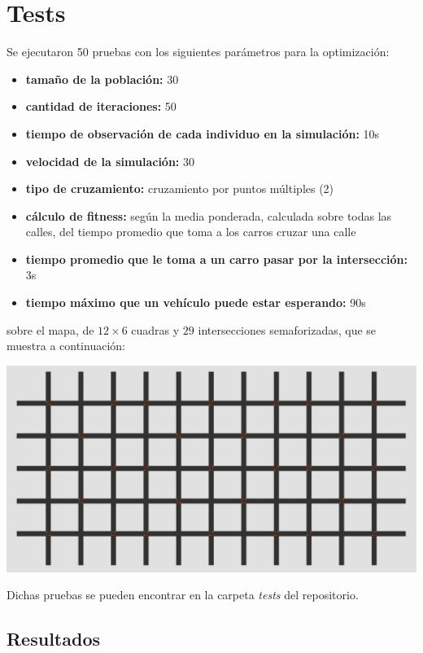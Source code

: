 \documentclass[colorinlistoftodos,twoside,twocolumn]{article} %
\begin{document}
	\section{Tests}
	
	Se ejecutaron 50 pruebas con los siguientes par\'ametros para la optimizaci\'on:
	\begin{itemize}
		\item \textbf{tama\~no de la poblaci\'on:} 30
		\item \textbf{cantidad de iteraciones:} 50
		\item \textbf{tiempo de observaci\'on de cada individuo en la simulaci\'on:} 10s
		\item \textbf{velocidad de la simulaci\'on:} 30
		\item \textbf{tipo de cruzamiento:} cruzamiento por puntos m\'ultiples (2)
		\item \textbf{c\'alculo de fitness:} seg\'un la media ponderada, calculada sobre todas las calles, del tiempo promedio que toma a los carros cruzar una calle
		\item \textbf{tiempo promedio que le toma a un carro pasar por la intersección:} 3s
		\item \textbf{tiempo máximo que un vehículo puede estar esperando:} 90s
	\end{itemize}
	sobre el mapa, de $ 12 \times 6 $ cuadras y $ 29 $ intersecciones semaforizadas, que se muestra a continuaci\'on:
	
	\begin{center}
		\includegraphics[width=\columnwidth]{map.jpg}
	\end{center}
	
	Dichas pruebas se pueden encontrar en la carpeta \emph{tests} del repositorio. 

	\subsection{Resultados}
\end{document}
